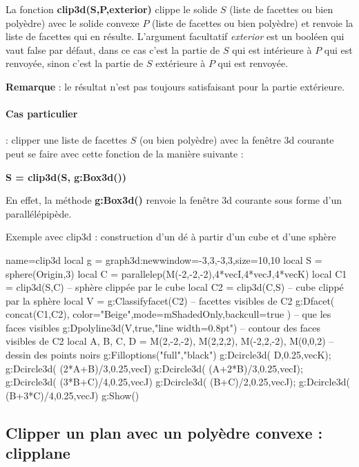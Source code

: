 La fonction \textbf{clip3d(S,P,exterior)} clippe le solide $S$ (liste de facettes ou bien polyèdre) avec le solide convexe $P$ (liste de facettes ou bien polyèdre) et renvoie la liste de facettes qui en résulte. L'argument facultatif \emph{exterior} est un booléen qui vaut false par défaut, dans ce cas c'est la partie de $S$ qui est intérieure à $P$ qui est renvoyée, sinon c'est la partie de $S$ extérieure à $P$ qui est renvoyée.\par
\textbf{Remarque} : le résultat n'est pas toujours satisfaisant pour la partie extérieure.

\paragraph{Cas particulier} : clipper une liste de facettes $S$ (ou bien polyèdre) avec la fenêtre 3d courante peut se faire avec cette fonction de la manière suivante :

\begin{center}
\textbf{S = clip3d(S, g:Box3d())}
\end{center}

En effet, la méthode \textbf{g:Box3d()} renvoie la fenêtre 3d courante sous forme d'un parallélépipède.

\begin{demo}[clip3d]{Exemple avec clip3d : construction d'un dé à partir d'un cube et d'une sphère}
\begin{luadraw}{name=clip3d}
local g = graph3d:new{window={-3,3,-3,3},size={10,10}}
local S = sphere(Origin,3)
local C = parallelep(M(-2,-2,-2),4*vecI,4*vecJ,4*vecK)
local C1 = clip3d(S,C) -- sphère clippée par le cube
local C2 = clip3d(C,S) -- cube clippé par la sphère
local V = g:Classifyfacet(C2) -- facettes visibles de C2
g:Dfacet( concat(C1,C2), {color="Beige",mode=mShadedOnly,backcull=true} ) -- que les faces visibles
g:Dpolyline3d(V,true,"line width=0.8pt") -- contour des faces visibles de C2
local A, B, C, D = M(2,-2,-2), M(2,2,2), M(-2,2,-2), M(0,0,2) -- dessin des points noirs
g:Filloptions("full","black")
g:Dcircle3d( D,0.25,vecK); g:Dcircle3d( (2*A+B)/3,0.25,vecI)
g:Dcircle3d( (A+2*B)/3,0.25,vecI); g:Dcircle3d( (3*B+C)/4,0.25,vecJ)
g:Dcircle3d( (B+C)/2,0.25,vecJ); g:Dcircle3d( (B+3*C)/4,0.25,vecJ)
g:Show()            
\end{luadraw}
\end{demo}

\subsection{Clipper un plan avec un polyèdre convexe : clipplane}

